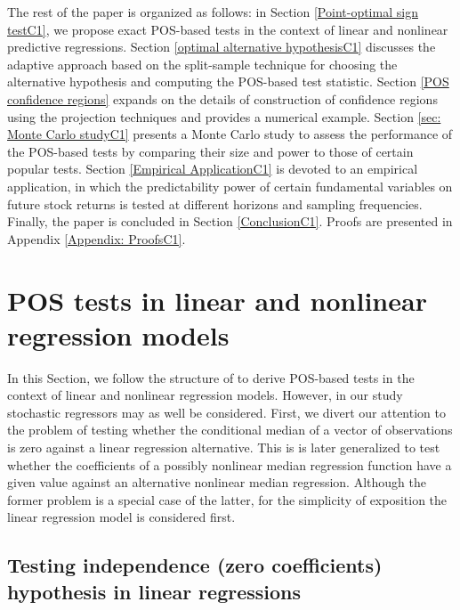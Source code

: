 \documentclass[harvard,11pt]{article}
\begin{document}
The rest of the paper is organized as follows: in Section \ref{Point-optimal sign testC1}, we
propose exact POS-based tests in the context of linear and nonlinear predictive
regressions. Section \ref{optimal alternative hypothesisC1} discusses the
adaptive approach based on the split-sample technique for choosing the alternative hypothesis and computing the POS-based
test statistic. Section \ref{POS confidence regions} expands on the details of construction of confidence regions using the projection techniques and provides a numerical example.
Section \ref{sec: Monte Carlo studyC1} presents a Monte Carlo study to assess
the performance of the POS-based tests by comparing their size and power to those of
certain popular tests. Section \ref{Empirical ApplicationC1} is devoted to an
empirical application, in which the predictability power of certain fundamental variables on future stock returns is tested at different horizons and sampling frequencies. Finally, the paper is concluded in
Section \ref{ConclusionC1}. Proofs are presented in Appendix \ref{Appendix:
ProofsC1}.


\section{POS tests in linear and nonlinear regression models \label{Point-optimal sign testC1}}

In this Section, we follow the structure of \citet{dufour2010exact} to derive POS-based tests in the context of linear and
nonlinear regression models. However, in our study stochastic regressors may as well be considered. First, we divert our attention to the problem of testing whether the conditional median of a vector of observations is zero against a linear
regression alternative. This is is later generalized to test whether the coefficients of a
possibly nonlinear median regression function have a given value against
an alternative nonlinear median regression. Although the former problem is a special case of the latter, for the simplicity of exposition the linear regression model is considered first.

\subsection{Testing independence (zero coefficients) hypothesis in linear
reg\-ressions \label{sec: Testing zero coefficient hypothesis in linear model}}
\end{document}
